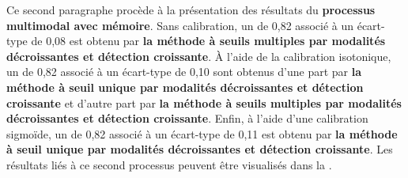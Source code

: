 Ce second paragraphe procède à la présentation des résultats du \textbf{processus multimodal avec mémoire}. Sans calibration, un \fscore{} de 0,82 associé à un écart-type de 0,08 est obtenu par \textbf{la méthode à seuils multiples par modalités décroissantes et détection croissante}. À l'aide de la calibration isotonique, un \fscore{} de 0,82 associé à un écart-type de 0,10 sont obtenus d'une part par \textbf{la méthode à seuil unique par modalités décroissantes et détection croissante} et d'autre part par \textbf{la méthode à seuils multiples par modalités décroissantes et détection croissante}. Enfin, à l'aide d'une calibration sigmoïde, un \fscore{} de 0,82 associé à un écart-type de 0,11 est obtenu par \textbf{la méthode à seuil unique par modalités décroissantes et détection croissante}. Les résultats liés à ce second processus peuvent être visualisés dans la .\par

